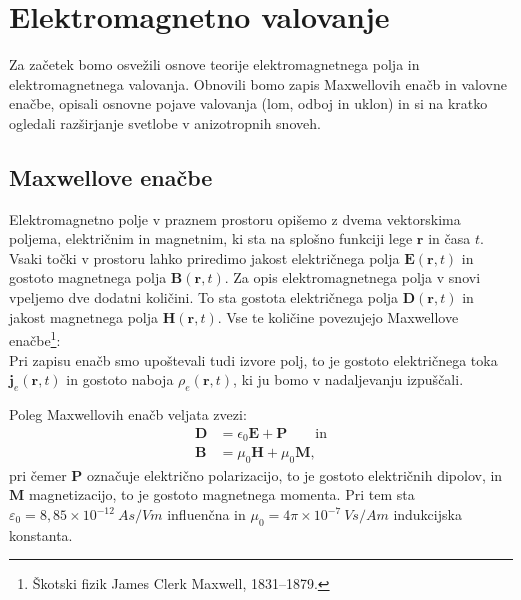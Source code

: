 
\chapter{Elektromagnetno valovanje}
Za začetek bomo osvežili osnove teorije elektromagnetnega polja in 
elektromagnetnega valovanja. Obnovili bomo zapis Maxwellovih enačb in 
valovne enačbe, opisali osnovne pojave valovanja (lom, odboj in uklon)
in si na kratko ogledali razširjanje svetlobe v anizotropnih snoveh.

\section{Maxwellove enačbe}
Elektromagnetno polje v praznem prostoru opišemo z dvema vektorskima
poljema, električnim in magnetnim, ki sta na splošno funkciji lege $\mathbf{r}$
in časa $t$. Vsaki točki v prostoru lahko priredimo jakost
električnega polja $\mathbf{E}(\mathbf{r},t)$ in gostoto
magnetnega polja $\mathbf{B}(\mathbf{r},t)$. Za opis elektromagnetnega
polja v snovi vpeljemo dve dodatni količini. To sta gostota
električnega polja $\mathbf{D}(\mathbf{r},t)$ in jakost magnetnega
polja $\mathbf{H}(\mathbf{r},t)$.
Vse te količine povezujejo Maxwellove
enačbe\footnote{Škotski fizik James Clerk Maxwell, 1831--1879.}:
\\
Pri zapisu enačb smo upoštevali tudi izvore polj, to je gostoto
električnega toka $\mathbf{j}_e(\mathbf{r},t)$ in gostoto
naboja $\rho_{e}(\mathbf{r},t)$, ki 
ju bomo v nadaljevanju izpuščali.

Poleg Maxwellovih enačb veljata zvezi:
\begin{align}
\mathbf{D} & =\epsilon_{0}\mathbf{E}+\mathbf{P} \qquad \mathrm{in}\\
\mathbf{B} & =\mu_{0}\mathbf{H}+\mu_{0}\mathbf{M},
\end{align}
pri čemer $\mathbf{P}$ označuje električno
polarizacijo, to je gostoto električnih dipolov, in  $\mathbf{M}$
magnetizacijo, to je gostoto magnetnega momenta. Pri tem sta
$\varepsilon_0 = 8,85 \times 10^{-12}~\si{As/Vm}$ influenčna in  
$\mu_0 = 4 \pi \times 10^{-7}~\si{Vs/Am}$ indukcijska konstanta.

